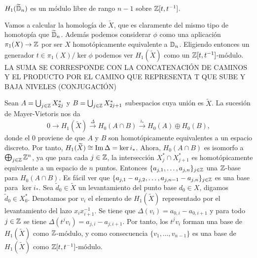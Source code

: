 \documentclass[TFG.tex]{subfiles}
\begin{document}
\begin{prop}\label{dimension}
$H_1(\widetilde{\mathbb{D}}_n)$ es un módulo libre de rango $n-1$ sobre $\mathbb{Z}[t,t^{-1}]$.
\end{prop}
\begin{dem}



Vamos a calcular la homología de $\widetilde{X}$, que es claramente del mismo tipo de homotopía que $\widetilde{\mathbb{D}}_n$. Además podemos considerar $\phi$ como una aplicación $\pi_1(X)\to\mathbb{Z}$ por ser $X$ homotópicamente equivalente a $\mathbb{D}_n$. Eligiendo entonces un generador $t\in \pi_1(X)/\ker\phi$ podemos ver $H_1(\widetilde{X})$ como un $\mathbb{Z}[t,t^{-1}]$-módulo. LA SUMA SE CORRESPONDE CON LA CONCATENACIÓN DE CAMINOS Y EL PRODUCTO POR EL CAMINO QUE REPRESENTA T QUE SUBE Y BAJA NIVELES (CONJUGACIÓN)

Sean $A=\bigcup_{j\in\mathbb{Z}}X_{2j}^*$ y $B=\bigcup_{j\in\mathbb{Z}}X_{2j+1}^*$ subespacios cuya unión es $\widetilde{X}$. La sucesión de Mayer-Vietoris nos da
\[
0\to H_1(\widetilde{X})\overset{\Delta}{\to} H_0(A\cap B)\overset{i_*}{\to} H_0(A)\oplus H_0(B),
\]
donde el 0 proviene de que $A$ y $B$ son homotópicamente equivalentes a un espacio discreto. Por tanto, $H_1(\widetilde{X})\cong \operatorname{Im}\Delta=\ker i_*$. Ahora, $H_0(A\cap B)$ es isomorfo a $\bigoplus_{j\in\mathbb{Z}}\mathbb{Z}^n$, ya que para cada $j\in\mathbb{Z}$, la intersección $X_j^*\cap X_{j+1}^*$ es homotópicamente equivalente a un espacio de $n$ puntos. Entonces $\{a_{j,1},\dots, a_{j,n}\}_{j\in\mathbb{Z}}$ una $\mathbb{Z}$-base para $H_0(A\cap B)$. Es fácil ver que $\{a_{j,1}-a_{j,2},\dots,a_{j,n-1}-a_{j,n}\}_{j\in\mathbb{Z}}$ es una base para $\ker i_*$. Sea $\tilde{d}_0\in\widetilde{X}$ un levantamiento del punto base $d_0\in X$, digamos $\tilde{d}_0\in X_0^*$. Denotamos por $v_i$ el elemento de $H_1(\widetilde{X})$ representado por el levantamiento del lazo $x_ix_{i+1}^{-1}$. Se tiene que $\Delta (v_i)=a_{0,i}-a_{0,i+1}$ \cite{thesis} y para todo $j\in\mathbb{Z}$ se tiene $\Delta(t^j v_i)=a_{j,i}-a_{j,i+1}$. Por tanto, los $t^jv_i$ forman una base de $H_1(\widetilde{X})$ como $\mathbb{Z}$-módulo, y como consecuencia $\{v_1,\dots, v_{n-1}\}$ es una base de $H_1(\widetilde{X})$ como $\mathbb{Z}[t,t^{-1}]$-módulo. \QED

\end{dem}
\end{document}
